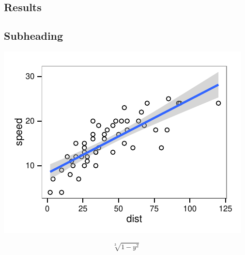\documentclass[twoside]{article}\usepackage[]{graphicx}\usepackage[]{color}
\makeatletter
\def\maxwidth{ %
  \ifdim\Gin@nat@width>\linewidth
    \linewidth
  \else
    \Gin@nat@width
  \fi
}
\newenvironment{knitrout}{}{} %
\makeatother
\begin{document}
\begin{multicols}{2}



\section{Results}


\subsection{Subheading}

\lipsum[1-2]

\begin{knitrout}
\color{fgcolor}
\includegraphics[width=\maxwidth]{figure/test_plot} 

\end{knitrout}


\lipsum 

\begin{equation}
   \sqrt[3]{1-y^2}
\end{equation}


\end{multicols}
\end{document}
